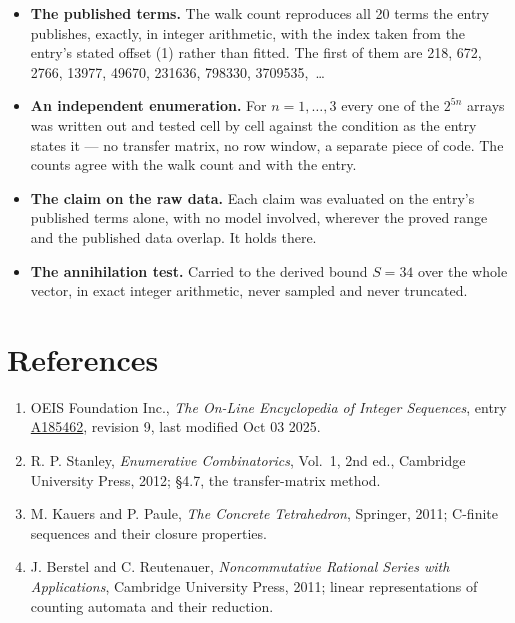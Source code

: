\documentclass[11pt]{article}
\theoremstyle{definition}
\begin{document}
\begin{itemize}

\item {\bfseries The published terms.} The walk count reproduces all 20 terms the entry publishes, exactly, in integer arithmetic, with the index taken from the entry's stated offset (1) rather than fitted. The first of them are 218, 672, 2766, 13977, 49670, 231636, 798330, 3709535,~\dots

\item {\bfseries An independent enumeration.} For $n = 1,\dots,3$ every one of the $2^{5n}$ arrays was written out and tested cell by cell against the condition as the entry states it --- no transfer matrix, no row window, a separate piece of code. The counts agree with the walk count and with the entry.

\item {\bfseries The claim on the raw data.} Each claim was evaluated on the entry's published terms alone, with no model involved, wherever the proved range and the published data overlap. It holds there.

\item {\bfseries The annihilation test.} Carried to the derived bound $S = 34$ over the whole vector, in exact integer arithmetic, never sampled and never truncated.

\end{itemize}

\section{References}

\begin{enumerate}

\item OEIS Foundation Inc., \emph{The On-Line Encyclopedia of Integer Sequences}, entry \href{https://oeis.org/A185462}{A185462}, revision 9, last modified Oct 03 2025.

\item R. P. Stanley, \emph{Enumerative Combinatorics}, Vol.~1, 2nd ed., Cambridge University Press, 2012; \S4.7, the transfer-matrix method.

\item M. Kauers and P. Paule, \emph{The Concrete Tetrahedron}, Springer, 2011; C-finite sequences and their closure properties.

\item J. Berstel and C. Reutenauer, \emph{Noncommutative Rational Series with Applications}, Cambridge University Press, 2011; linear representations of counting automata and their reduction.

\end{enumerate}
\end{document}

